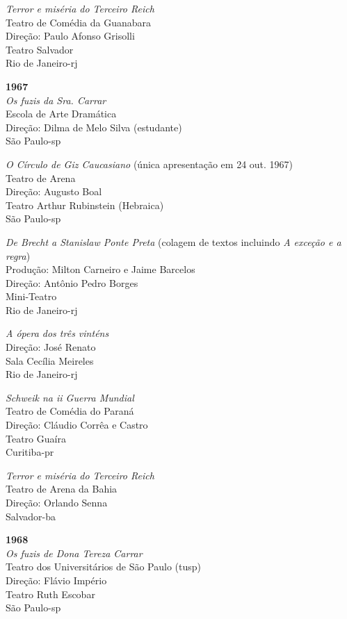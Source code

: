 {{\it Terror e miséria do Terceiro Reich}\\
Teatro de Comédia da Guanabara\\
Direção: Paulo Afonso Grisolli\\
Teatro Salvador\\
Rio de Janeiro-{\sc rj}

\item{\bf 1967}\\
{\it Os fuzis da Sra. Carrar}\\
Escola de Arte Dramática\\
Direção: Dilma de Melo Silva (estudante)\\
São Paulo-{\sc sp}

{\it O Círculo de Giz Caucasiano} (única apresentação em 24 out. 1967)\\
Teatro de Arena\\
Direção: Augusto Boal\\
Teatro Arthur Rubinstein (Hebraica)\\
São Paulo-{\sc sp}

{\it De Brecht a Stanislaw Ponte Preta} (colagem de textos incluindo
{\it A exceção e a regra})\\
Produção: Milton Carneiro e Jaime Barcelos\\
Direção: Antônio Pedro Borges\\
Mini-Teatro\\
Rio de Janeiro-{\sc rj}

{\it A ópera dos três vinténs}\\
Direção: José Renato\\
Sala Cecília Meireles\\
Rio de Janeiro-{\sc rj}

{\it Schweik na {\sc ii} Guerra Mundial}\\
Teatro de Comédia do Paraná\\
Direção: Cláudio Corrêa e Castro\\
Teatro Guaíra\\
Curitiba-{\sc pr}

{\it Terror e miséria do Terceiro Reich}\\
Teatro de Arena da Bahia\\
Direção: Orlando Senna\\
Salvador-{\sc ba}

\item{\bf 1968}\\
{\it Os fuzis de Dona Tereza Carrar}\\
Teatro dos Universitários de São Paulo ({\sc tusp})\\
Direção: Flávio Império\\
Teatro Ruth Escobar\\
São Paulo-{\sc sp}

}
